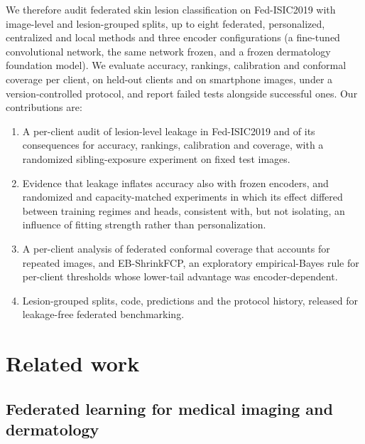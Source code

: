 \documentclass[VANCOUVER,Times1COL]{WileyNJDv5}
\begin{document}
We therefore audit federated skin lesion classification on Fed-ISIC2019 with image-level and
lesion-grouped splits, up to eight federated, personalized, centralized and local methods and three
encoder configurations (a fine-tuned convolutional network, the same network frozen, and a frozen
dermatology foundation model). We evaluate accuracy, rankings, calibration and conformal coverage per
client, on held-out clients and on smartphone images, under a version-controlled protocol, and report
failed tests alongside successful ones. Our contributions are:
\begin{enumerate}
  \item A per-client audit of lesion-level leakage in Fed-ISIC2019 and of its consequences for accuracy,
    rankings, calibration and coverage, with a randomized sibling-exposure experiment on fixed test images.
  \item Evidence that leakage inflates accuracy also with frozen encoders, and randomized and
    capacity-matched experiments in which its effect differed between training regimes and heads,
    consistent with, but not isolating, an influence of fitting strength rather than personalization.
  \item A per-client analysis of federated conformal coverage that accounts for repeated images, and
    EB-ShrinkFCP, an exploratory empirical-Bayes rule for per-client thresholds whose lower-tail
    advantage was encoder-dependent.
  \item Lesion-grouped splits, code, predictions and the protocol history, released for leakage-free
    federated benchmarking.
\end{enumerate}

\section{Related work}
\label{sec:related}

\subsection{Federated learning for medical imaging and dermatology}
\end{document}

